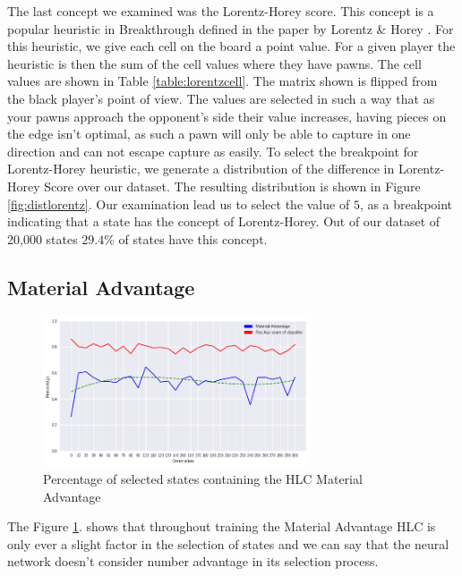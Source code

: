\label{section:lorentzhoreyref}

The last concept we examined was the Lorentz-Horey score. This concept is a popular heuristic in Breakthrough defined in the paper by Lorentz \& Horey \cite{lorentz:heuristic}. For this heuristic, we give each cell on the board a point value. For a given player the heuristic is then the sum of the cell values where they have pawns. The cell values are shown in Table \ref{table:lorentzcell}. The matrix shown is flipped from the black player's point of view. The values are selected in such a way that as your pawns approach the opponent's side their value increases, having pieces on the edge isn't optimal, as such a pawn will only be able to capture in one direction and can not escape capture as easily. To select the breakpoint for Lorentz-Horey heuristic, we generate a distribution of the difference in Lorentz-Horey Score over our dataset. The resulting distribution is shown in Figure \ref{fig:distlorentz}. Our examination lead us to select the value of $5$, as a breakpoint indicating that a state has the concept of Lorentz-Horey. Out of our dataset of 20,000 states $29.4\%$ of states have this concept.

\subsection{Material Advantage}

\begin{figure}[h]
    \centering
    \includegraphics[width=0.7\textwidth]{graphics/number_pawns_trend}
    \caption{Percentage of selected states containing the HLC Material Advantage}
    \label{fig:numberadvantage}
\end{figure}

The Figure \ref{fig:numberadvantage}. shows that throughout training the Material Advantage HLC is only ever a slight factor in the selection of states and we can say that the neural network doesn't consider number advantage in its selection process.

